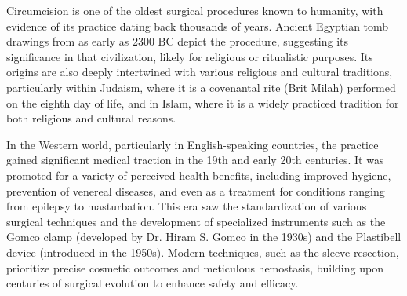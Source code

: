 Circumcision is one of the oldest surgical procedures known to humanity, with evidence of its practice dating back thousands of years. Ancient Egyptian tomb drawings from as early as 2300 BC depict the procedure, suggesting its significance in that civilization, likely for religious or ritualistic purposes. Its origins are also deeply intertwined with various religious and cultural traditions, particularly within Judaism, where it is a covenantal rite (Brit Milah) performed on the eighth day of life, and in Islam, where it is a widely practiced tradition for both religious and cultural reasons.

In the Western world, particularly in English-speaking countries, the practice gained significant medical traction in the 19th and early 20th centuries. It was promoted for a variety of perceived health benefits, including improved hygiene, prevention of venereal diseases, and even as a treatment for conditions ranging from epilepsy to masturbation. This era saw the standardization of various surgical techniques and the development of specialized instruments such as the Gomco clamp (developed by Dr. Hiram S. Gomco in the 1930s) and the Plastibell device (introduced in the 1950s). Modern techniques, such as the sleeve resection, prioritize precise cosmetic outcomes and meticulous hemostasis, building upon centuries of surgical evolution to enhance safety and efficacy.

